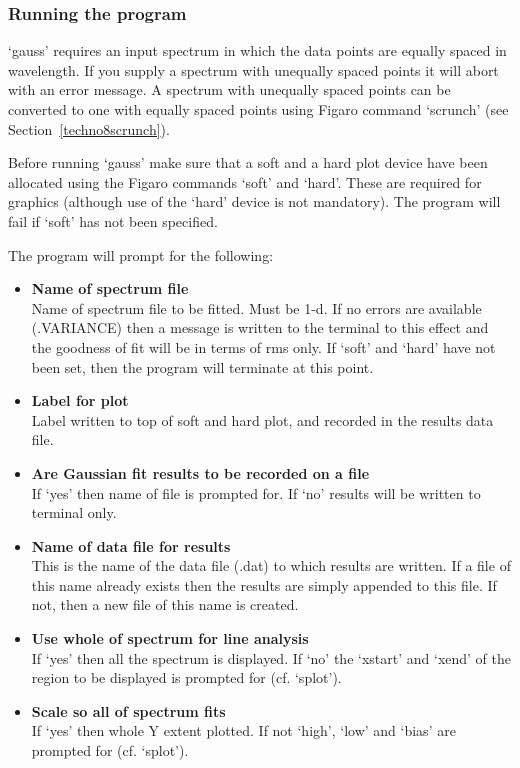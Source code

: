 \documentclass[11pt,twoside]{article}
\begin{document}

\subsubsection{\label{techno12running}Running the program}

   `gauss' requires an input spectrum in which the data points are
   equally spaced in wavelength.  If you supply a spectrum with
   unequally spaced points it will abort with an error message.  A
   spectrum with unequally spaced points can be converted to one with
   equally spaced points using Figaro command `scrunch' (see
   Section~\ref{techno8scrunch}).

   Before running `gauss' make sure that a soft and a hard plot device
   have been allocated using the Figaro commands `soft' and `hard'.
   These are required for graphics (although use of the `hard' device is
   not mandatory). The program will fail if `soft' has not been
   specified.

   The program will prompt for the following:

\begin{itemize}
\item{\bf Name of spectrum file}\ \\
   Name of spectrum file to be fitted. Must be 1-d. If no errors are
   available (.VARIANCE) then a message is written to the terminal to
   this effect and the goodness of fit will be in terms of rms only.
   If `soft' and `hard' have not been set, then the program will
   terminate at this point.
\item{\bf Label for plot}\ \\
   Label written to top of soft and hard plot, and recorded in the
   results data file.
\item{\bf Are Gaussian fit results to be recorded on a file}\ \\
   If `yes' then name of file is prompted for. If `no' results will be
   written to terminal only.
\item{\bf Name of data file for results}\ \\
   This is the name of the data file (.dat) to which results are
   written. If a file of this name already exists then the results are
   simply appended to this file. If not, then a new file of this name is
   created.
\item{\bf Use whole of spectrum for line analysis}\ \\
   If `yes' then all the spectrum is displayed. If `no' the `xstart' and
   `xend' of the region to be displayed is prompted for (cf. `splot').
\item{\bf Scale so all of spectrum fits}\ \\
   If `yes' then whole Y extent plotted. If not `high', `low' and `bias'
   are prompted for (cf. `splot').
\end{itemize}
\end{document}
